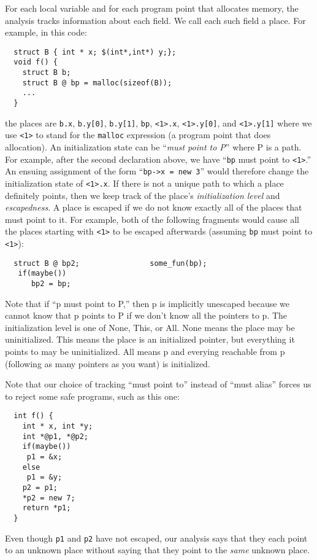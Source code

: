 For each local variable and for each program point that allocates
memory, the analysis tracks information about each field.  We call
each such field a place. For example, in this code:
\begin{verbatim}
  struct B { int * x; $(int*,int*) y;}; 
  void f() {
    struct B b;
    struct B @ bp = malloc(sizeof(B));
    ...
  }
\end{verbatim}
the places are \texttt{b.x}, \texttt{b.y[0]}, \texttt{b.y[1]}, \texttt{bp},
\texttt{<1>.x}, \texttt{<1>.y[0]}, and \texttt{<1>.y[1]} where we use
\texttt{<1>} to stand for the \texttt{malloc} expression (a program point
that does allocation).  An initialization state can be ``\emph{must
  point to P}'' where P is a path.  For example, after the second
declaration above, we have ``\texttt{bp} must point to \texttt{<1>}.''  An
ensuing assignment of the form ``\texttt{bp->x = new 3}'' would therefore
change the initialization state of \texttt{<1>.x}.  If there is not a
unique path to which a place definitely points, then we keep track of
the place's \emph{initialization level} and \emph{escapedness}.  A
place is escaped if we do not know exactly all of the places that must
point to it.  For example, both of the following fragments would cause
all the places starting with \texttt{<1>} to be escaped afterwards
(assuming \texttt{bp} must point to \texttt{<1>}):
\begin{verbatim}
  struct B @ bp2;                some_fun(bp);                      
   if(maybe()) 
      bp2 = bp;
\end{verbatim}

Note that if ``p must point to P,'' then p is implicitly unescaped
because we cannot know that p points to P if we don't know all the
pointers to p.  The initialization level is one of None, This, or All.
None means the place may be uninitialized.  This means the place is an
initialized pointer, but everything it points to may be uninitialized.
All means p and everying reachable from p (following as many pointers
as you want) is initialized.

Note that our choice of tracking ``must point to'' instead of ``must
alias'' forces us to reject some safe programs, such as this one:
\begin{verbatim}
  int f() {
    int * x, int *y;
    int *@p1, *@p2;
    if(maybe())
     p1 = &x;
    else
     p1 = &y;
    p2 = p1;
    *p2 = new 7;
    return *p1;
  }
\end{verbatim}

Even though \texttt{p1} and \texttt{p2} have not escaped, our analysis
says that they each point to an unknown place without saying that they
point to the \emph{same} unknown place.

